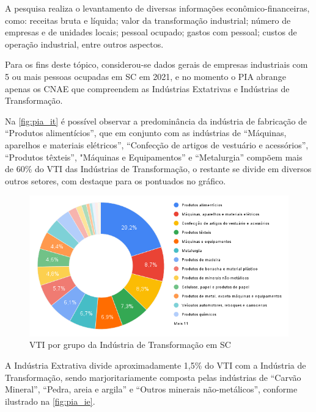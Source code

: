 A pesquisa realiza o levantamento de diversas informações econômico-financeiras, como: receitas bruta e líquida; valor da transformação industrial; número de empresas e de unidades locais; pessoal ocupado; gastos com pessoal; custos de operação industrial, entre outros aspectos. 

Para os fins deste tópico, considerou-se dados gerais de empresas industriais com 5 ou mais pessoas ocupadas em \gls{SC} em 2021, e no momento o \gls{PIA} abrange apenas os \gls{CNAE} que compreendem as Indústrias Extatrivas e Indústrias de Transformação.

Na \autoref{fig:pia_it} é possível observar a predominância da indústria de fabricação de “Produtos alimentícios”, que em conjunto com as indústrias de “Máquinas, aparelhos e materiais elétricos”, “Confecção de artigos de vestuário e acessórios”, “Produtos têxteis”, "Máquinas e Equipamentos” e “Metalurgia” compõem mais de 60\% do \gls{VTI} das Indústrias de Transformação, o restante se divide em diversos outros setores, com destaque para os pontuados no gráfico. 

\begin{figure}[ht]
	\caption{\label{fig:pia_it} \gls{VTI} por grupo da Indústria de Transformação em \gls{SC} }
	\begin{center}
		\includegraphics[scale=0.5]{images/pia-ibge-2021-it.png}
	\end{center}
\end{figure}

A Indústria Extrativa divide aproximadamente 1,5\% do \gls{VTI} com a Indústria de Transformação, sendo marjoritariamente composta pelas indústrias de “Carvão Mineral”, “Pedra, areia e argila” e “Outros minerais não-metálicos”, conforme ilustrado na \autoref{fig:pia_ie}.

